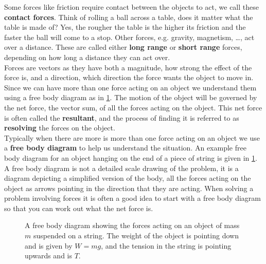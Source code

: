 \documentclass[a4paper,12pt]{book}
\begin{document}
Some forces like friction require contact between the objects to act, we call these \textbf{contact forces}. Think of rolling a ball across a table, does it matter what the table is made of? Yes, the rougher the table is the higher its friction and the faster the ball will come to a stop. Other forces, e.g. gravity, magnetism, \dots{}, act over a distance. These are called either \textbf{long range} or \textbf{short range} forces, depending on how long a distance they can act over. \\

Forces are vectors as they have both a magnitude, how strong the effect of the force is, and a direction, which direction the force wants the object to move in.  Since we can have more than one force acting on an object we understand them using a free body diagram as in \cref{fig: free body diagram}. The motion of the object will be governed by the net force, the vector sum, of all the forces acting on the object. This net force is often called the \textbf{resultant}, and the process of finding it is referred to as \textbf{resolving} the forces on the object.\\

Typically when there are more is more than one force acting on an object we use a \textbf{free body diagram} to help us understand the situation. An example free body diagram for an object hanging on the end of a piece of string is given in \cref{fig: free body diagram}.  A free body diagram is not a detailed scale drawing of the problem, it is a diagram depicting a simplified version of the body, all the forces acting on the object as arrows pointing in the direction that they are acting. When solving a problem involving forces it is often a good idea to start with a free body diagram so that you can work out what the net force is.

\begin{figure}[ht]
\def\iangle{35} %

\def\down{-90}
\def\arcr{0.5cm} %
    \centering
    \caption{A free body diagram showing the forces acting on an object of mass $m$ suspended on a string. The weight of the object is pointing down and is given by $W=mg$, and the tension in the string is pointing upwards and is $T$. }
    \label{fig: free body diagram}
\end{figure}
\end{document}
